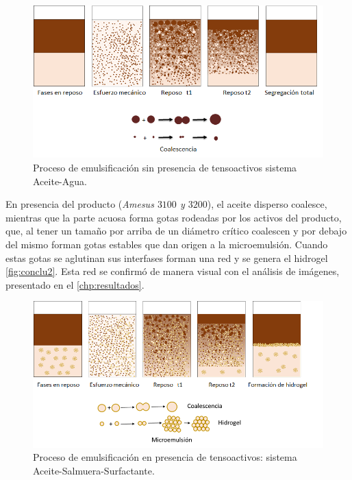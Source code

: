 \begin{figure}[h]
    \centering
    \includegraphics[width = \textwidth]{Graphics/Conclutions/coales_1.png}
    \caption[Proceso de emulsificación sin tensoactivos]{Proceso de emulsificación sin presencia de tensoactivos sistema Aceite-Agua.}
    \label{fig:conclu1}
\end{figure}


En presencia del producto (\emph{Amesus $3100$ y $3200$}), el aceite disperso coalesce, mientras que la parte acuosa forma gotas rodeadas por los activos del producto, que, al tener un tamaño por arriba de un diámetro crítico coalescen y por debajo del mismo forman gotas estables que dan origen a la microemulsión. Cuando estas gotas se aglutinan sus interfases forman una red y se genera el hidrogel \autoref{fig:conclu2}. Esta red se confirmó de manera visual con el análisis de imágenes, presentado en el \autoref{chp:resultados}.

\begin{figure}[h]
    \centering
    \includegraphics[width=\textwidth]{Graphics/Conclutions/coales_2.png}
    \caption[Proceso de emulsificación sin tensoactivos]{Proceso de emulsificación en presencia de tensoactivos: sistema Aceite-Salmuera-Surfactante.}
    \label{fig:conclu2}
\end{figure}

